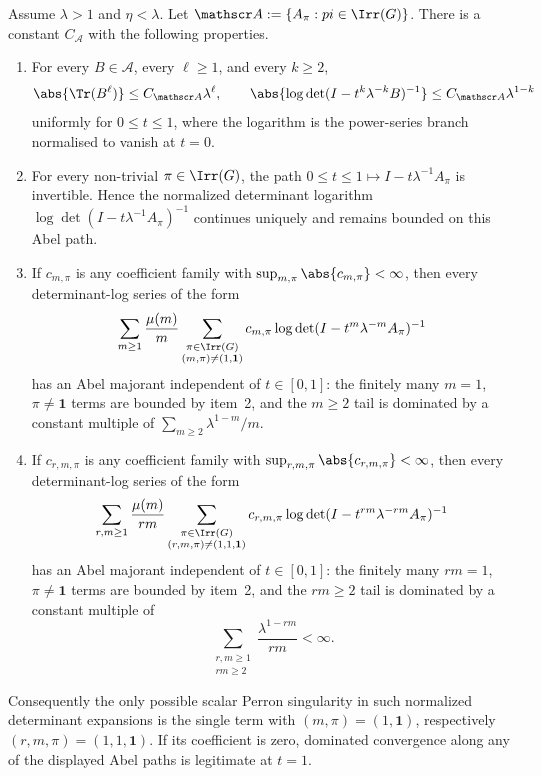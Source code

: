 \begin{lemma}
  \label{lem:perron-boundary-trace-power-majorant}
  Assume \(\lambda>1\) and \(\eta<\lambda\). Let
  \(\mathscr A:=\{A_\pi:\\pi\in\Irr(G)\}\). There is a constant
  \(C_{\mathscr A}\) with the following properties.
  \begin{enumerate}
  \item For every \(B\in\mathscr A\), every \(\ell\ge1\), and every
    \(k\ge2\),
    \begin{equation}\label{eq:trace-power-perron-bound}
      \abs{\Tr(B^\ell)}\le C_{\mathscr A}\lambda^\ell,
      \qquad
      \abs{\log\det(I-t^k\lambda^{-k}B)^{-1}}
      \le C_{\mathscr A}\lambda^{1-k}
    \end{equation}
    uniformly for \(0\le t\le1\), where the logarithm is the power-series
    branch normalised to vanish at \(t=0\).
  \item For every non-trivial \(\pi\in\Irr(G)\), the path
    \(0\le t\le1\mapsto I-t\lambda^{-1}A_\pi\) is invertible. Hence the
    normalized determinant logarithm
    \(\log\det(I-t\lambda^{-1}A_\pi)^{-1}\) continues uniquely and remains
    bounded on this Abel path.
  \item If \(c_{m,\pi}\) is any coefficient family with
    \(\sup_{m,\pi}\abs{c_{m,
    \pi}}<\infty\), then every determinant-log series of the form
    \[
      \sum_{m\ge1}\frac{\mu(m)}{m}
      \sum_{\substack{\pi\in\Irr(G)\\(m,\pi)\neq(1,\mathbf1)}}
        c_{m,\pi}\log\det(I-t^m\lambda^{-m}A_\pi)^{-1}
    \]
    has an Abel majorant independent of \(t\in[0,1]\): the finitely many
    \(m=1\), \(\pi\neq\mathbf1\) terms are bounded by item~2, and the
    \(m\ge2\) tail is dominated by a constant multiple of
    \(\sum_{m\ge2}\lambda^{1-m}/m\).
  \item If \(c_{r,m,
    \pi}\) is any coefficient family with
    \(\sup_{r,m,
    \pi}\abs{c_{r,m,
    \pi}}<\infty\), then every determinant-log series of the form
    \[
      \sum_{r,m\ge1}\frac{\mu(m)}{rm}
      \sum_{\substack{\pi\in\Irr(G)\\(r,m,\pi)\neq(1,1,\mathbf1)}}
        c_{r,m,
        \pi}
        \log\det(I-t^{rm}\lambda^{-rm}A_\pi)^{-1}
    \]
    has an Abel majorant independent of \(t\in[0,1]\): the finitely many
    \(rm=1\), \(\pi\neq\mathbf1\) terms are bounded by item~2, and the
    \(rm\ge2\) tail is dominated by a constant multiple of
    \begin{equation}\label{eq:double-trace-power-majorant}
      \sum_{\substack{r,m\ge1\\rm\ge2}}\frac{\lambda^{1-rm}}{rm}<\infty .
    \end{equation}
  \end{enumerate}
  Consequently the only possible scalar Perron singularity in such
  normalized determinant expansions is the single term with
  \((m,\pi)=(1,\mathbf1)\), respectively
  \((r,m,\pi)=(1,1,\mathbf1)\). If its coefficient is zero, dominated
  convergence along any of the displayed Abel paths is legitimate at
  \(t=1\).
\end{lemma}


